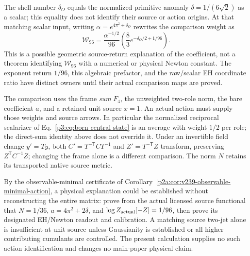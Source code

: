 \documentclass[11pt,a4paper]{article}
\begin{document}
\begin{remark}
\label{p3g:rem:v252-96-physical-boundary}
The shell number \(\delta_O\) equals the normalized primitive anomaly
\(\delta=1/(6\sqrt2)\) as a scalar; this equality does not identify their
source or action origins. At that matching scalar input, writing
\(\alpha=e^{4\pi^2+\delta_O}\) rewrites the comparison weight as
\begin{equation}
\label{p3g:eq:v252-alpha-96-rewrite}
 \mathcal W_{96}=\frac{\alpha^{-1/2}}{96}
       \left(\frac83e^{-\delta_O/2+1/96}\right).
\end{equation}
This is a possible geometric source-return explanation of the coefficient,
not a theorem identifying \(\mathcal W_{96}\) with a numerical or physical
Newton constant. The exponent return \(1/96\), this algebraic prefactor,
and the raw/scalar EH coordinate ratio have distinct owners until their
actual comparison maps are proved.

The comparison uses the frame \emph{sum} \(F_4\), the unweighted two-role
norm, the bare coefficient \(a\), and a retained unit source \(x=1\).
An actual action must supply those weights and source arrows. In particular
the normalized reciprocal scalarizer of
Eq.~\eqref{p3:eq:born-central-state} is an average with weight \(1/2\) per
role; the direct-sum identity above does not override it. Under an invertible
field change \(y'=Ty\), both
\(C'=T^{-\mathsf T}CT^{-1}\) and \(Z'=T^{-\mathsf T}Z\) transform, preserving
\(Z^{\mathsf T}C^{-1}Z\); changing the frame alone is a different comparison. The norm \(N\) retains
its transported native source metric.

By the observable-minimal certificate of
Corollary~\ref{p2a:cor:v239-observable-minimal-action}, a physical explanation
could be established without reconstructing the entire matrix: prove from
the actual licensed source functional that \(N=1/36\),
\(a=4\pi^2+2\delta\), and \(\log Z_{\rm actual}[-Z]=1/96\), then prove
its designated EH/Newton readout and calibration. A matching source two-jet
alone is insufficient at unit source unless Gaussianity is established or
all higher contributing cumulants are controlled. The present calculation
supplies no such action identification and changes no main-paper physical
claim.
\end{remark}
\end{document}
